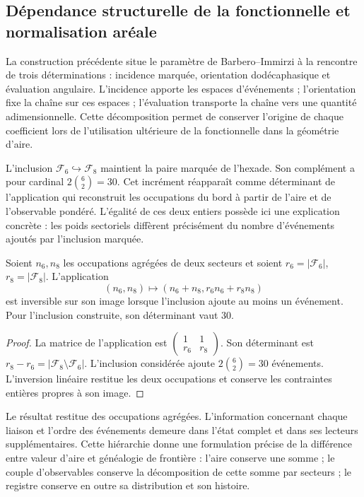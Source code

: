 \subsection{Dépendance structurelle de la fonctionnelle et normalisation aréale}

La construction précédente situe le paramètre de Barbero--Immirzi à la
rencontre de trois déterminations : incidence marquée, orientation
dodécaphasique et évaluation angulaire. L'incidence apporte les espaces
d'événements ; l'orientation fixe la chaîne sur ces espaces ;
l'évaluation transporte la chaîne vers une quantité adimensionnelle. Cette
décomposition permet de conserver l'origine de chaque coefficient lors de
l'utilisation ultérieure de la fonctionnelle dans la géométrie d'aire.

L'inclusion \(\mathcal F_6\hookrightarrow\mathcal F_8\) maintient
la paire marquée de l'hexade. Son complément a pour cardinal
\(2\binom62=30\). Cet incrément réapparaît comme déterminant de
l'application qui reconstruit les occupations du bord à partir de l'aire et
de l'observable pondéré. L'égalité de ces deux entiers possède ici
une explication concrète : les poids sectoriels diffèrent précisément
du nombre d'événements ajoutés par l'inclusion marquée.

\begin{proposition}
Soient \(n_6,n_8\) les occupations agrégées de deux secteurs et soient
\(r_6=|\mathcal F_6|\), \(r_8=|\mathcal F_8|\). L'application
\[
 (n_6,n_8)\longmapsto(n_6+n_8,r_6n_6+r_8n_8)
\]
est inversible sur son image lorsque l'inclusion ajoute au moins un
événement. Pour l'inclusion construite, son déterminant vaut 30.
\end{proposition}
\begin{proof}
La matrice de l'application est
\(\left(\begin{smallmatrix}1&1\\r_6&r_8\end{smallmatrix}\right)\).
Son déterminant est \(r_8-r_6=|\mathcal F_8\setminus\mathcal F_6|\).
L'inclusion considérée ajoute \(2\binom62=30\) événements. L'inversion
linéaire restitue les deux occupations et conserve les contraintes entières
propres à son image.
\end{proof}

Le résultat restitue des occupations agrégées. L'information concernant
chaque liaison et l'ordre des événements demeure dans l'état complet
et dans ses lecteurs supplémentaires. Cette hiérarchie donne une formulation
précise de la différence entre valeur d'aire et généalogie de frontière :
l'aire conserve une somme ; le couple d'observables conserve la
décomposition de cette somme par secteurs ; le registre conserve en outre
sa distribution et son histoire.

